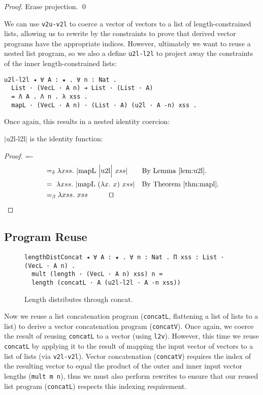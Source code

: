 \documentclass[a4paper,envcountsame,envcountsect]{llncs}
\newcommand{\eqed}[0]{\tag*{\qed}}
\newcommand{\labsec}[1]{\label{sec:#1}}
\newcommand{\labfig}[1]{\label{fig:#1}}
\newcommand{\refthm}[1]{Theorem \ref{thm:#1}}
\newcommand{\reflem}[1]{Lemma \ref{lem:#1}}
\newcommand{\lablem}[1]{\label{lem:#1}}
\newcommand{\earg}[1]{\,\,#1}
\newcommand{\erase}[1]{\ensuremath{\lvert #1 \rvert}}
\newcommand{\Erase}[1]{\ensuremath{\Big\lvert #1 \Big\rvert}}
\newcommand{\fun}[1]{\lambda #1 .~}
\newcommand{\by}[1]{\text{#1}}
\newcommand{\name}[1]{\textrm{#1}}
\begin{document}
\begin{proof}
{\small
Erase projection. \qed
}
\end{proof}

We can use \texttt{v2u-v2l} to coerce a vector of vectors to a list of
length-constrained lists, allowing us to rewrite by the constraints to
prove that derived vector programs have the appropriate
indices. However, ultimately we want to reuse a nested list program,
so we also a define \texttt{u2l-l2l} to project away the constraints
of the inner length-constrained lists:

\begin{verbatim}
u2l-l2l ◂ ∀ A : ★ . ∀ n : Nat .
  List · (VecL · A n) ➔ List · (List · A)
  = Λ A . Λ n . λ xss .
  mapL · (VecL · A n) · (List · A) (u2l · A -n) xss .
\end{verbatim}

Once again, this results in a nested identity coercion:

\begin{lemma}
\erase{\name{u2l-l2l}} is the identity function:
\lablem{u2ll2l}
\end{lemma}

\begin{proof}
{\small
\abovedisplayskip=-\baselineskip
\begin{align*}
  &=_\delta \fun{xss} \erase{
    \name{mapL} \earg \Erase{\name{u2l}} \earg xss
  }
  && \by{By \reflem{u2l}.}
  \\
  &=~ \fun{xss} \erase{
    \name{mapL} \earg (\fun{x}{x}) \earg xss
  }
  && \by{By \refthm{mapl}.}
  \\
  &=_\beta \fun{xss}{xss}
  \eqed
\end{align*}}
\end{proof}

\subsection{Program Reuse}
\labsec{nestreuse:progreuse}

\begin{figure}[t]
\centering
\begin{verbatim}
lengthDistConcat ◂ ∀ A : ★ . ∀ n : Nat . Π xss : List · (VecL · A n) .
  mult (length · (VecL · A n) xss) n ≃ 
  length (concatL · A (u2l-l2l · A -n xss))
\end{verbatim}
\caption{Length distributes through concat.}
\labfig{lendistconcat}
\end{figure}

Now we reuse a list concatenation program
(\texttt{concatL}, flattening a list of lists to a list)
to derive a vector concatenation program (\texttt{concatV}).
Once again, we coerce the result of reusing
\texttt{concatL} to a vector (using \texttt{l2v}). However,
this time we reuse \texttt{concatL} by applying it to the result of
mapping the input vector of vectors to a list of lists
(via \texttt{v2l-v2l}). Vector concatenation (\texttt{concatV})
requires the index of the resulting vector to equal the product of the
outer and inner input vector lengths (\texttt{mult m n}), thus we must
also perform rewrites to ensure that our reused list program
(\texttt{concatL}) respects this indexing requirement.
\end{document}
